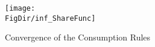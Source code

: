 \hypertarget{inf_ShareFunc}{}
\begin{figure}[tbp]
\centerline{\texttt{[image: \\FigDir/inf\_ShareFunc]}}
\caption{Convergence of the Consumption Rules}
\label{fig:inf_ShareFunc}
\end{figure}